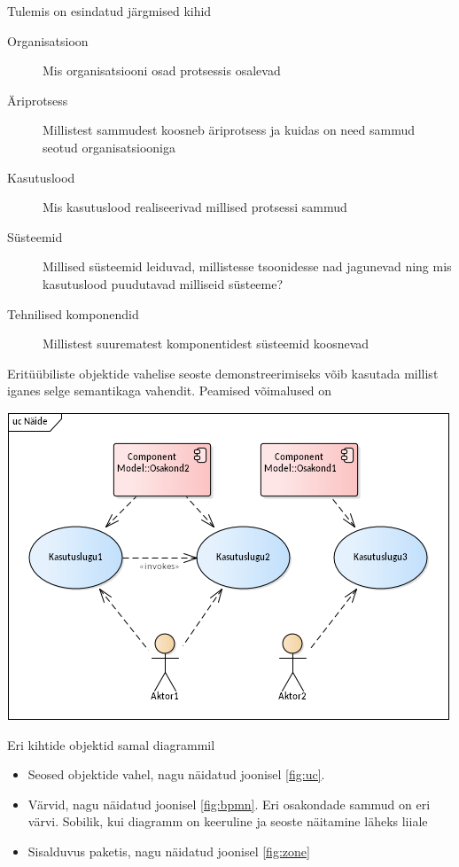 \documentclass[nobib]{tufte-handout}
\begin{document}
Tulemis on esindatud järgmised kihid
\begin{description}
	\item[Organisatsioon] Mis organisatsiooni osad protsessis osalevad
	\item[Äriprotsess] Millistest sammudest koosneb äriprotsess ja kuidas on need sammud seotud organisatsiooniga
	\item[Kasutuslood] Mis kasutuslood realiseerivad millised protsessi sammud
	\item[Süsteemid] Millised süsteemid leiduvad, millistesse tsoonidesse nad jagunevad ning mis kasutuslood puudutavad milliseid süsteeme?
	\item[Tehnilised komponendid] Millistest suurematest komponentidest süsteemid koosnevad
\end{description}

Eritüübiliste objektide vahelise seoste demonstreerimiseks võib kasutada millist iganes selge semantikaga vahendit. Peamised võimalused on
\begin{marginfigure}%
  \includegraphics[width=\linewidth]{kasutuslood.png}
  \caption{Eri kihtide objektid samal diagrammil}
  \label{fig:uc}
\end{marginfigure}

\begin{itemize}
	\item Seosed objektide vahel, nagu näidatud joonisel \ref{fig:uc}. 
	\item Värvid, nagu näidatud joonisel \ref{fig:bpmn}. Eri osakondade sammud on eri värvi. Sobilik, kui diagramm on keeruline ja seoste näitamine läheks liiale
	\item Sisalduvus paketis, nagu näidatud joonisel \ref{fig:zone}
\end{itemize}
\end{document}

